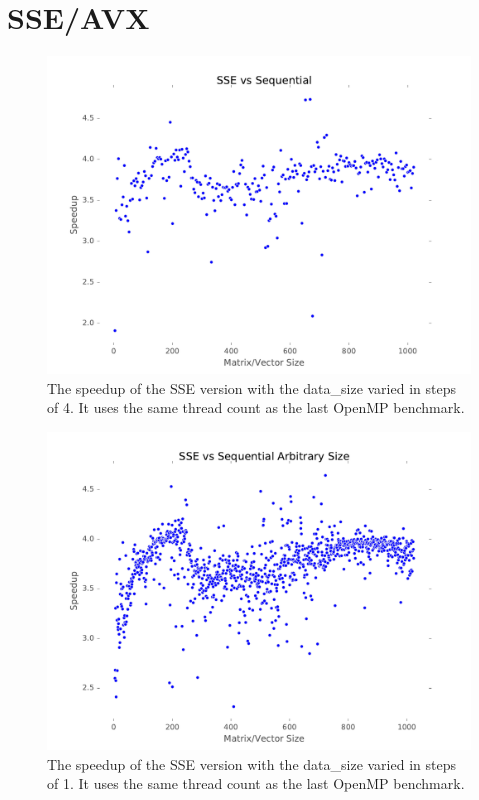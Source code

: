 \documentclass[final]{report}
\begin{document}
\chapter{SSE/AVX}

\begin{figure}[H]
\centering
    \includegraphics[width=\linewidth]{resources/sse-data-size-sweep.pdf}
    \caption{The speedup of the SSE version with the data\_size varied in steps of 4. It uses the same thread count as the last OpenMP benchmark.}
    \label{fig:sse-data-size-sweep}
\end{figure}

\begin{figure}[H]
\centering
    \includegraphics[width=\linewidth]{resources/sse-data-size-sweep-arbitrary.pdf}
    \caption{The speedup of the SSE version with the data\_size varied in steps of 1. It uses the same thread count as the last OpenMP benchmark.}
    \label{fig:sse-data-size-sweep-arbitrary}
\end{figure}
\end{document}
